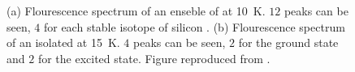     \begin{figure}[thbp]
  		\begin{subfigure}[t]{ 0.49\linewidth}
  			\centering
  			\caption{}
  		\end{subfigure}
  		\hfill
  		\begin{subfigure}[t]{ 0.49\linewidth}
  			\centering
  			\caption{}
  		\end{subfigure}
  		\caption[Flourescence spectra of \sivs at low temperature]{(a) Flourescence spectrum of an enseble of \sivs at \SI{10}{\kelvin}. $12$ peaks can be seen, $4$ for each stable isotope of silicon \cite{becker::42}. (b) Flourescence spectrum of an isolated \siv at \SI{15}{\kelvin}. $4$ peaks can be seen, $2$ for the ground state and $2$ for the excited state. Figure reproduced from \cite{Riedrich-moller2014}.}
  		\label{fig::cryogenic_spectra}
  	\end{figure}
